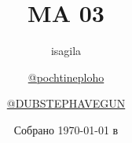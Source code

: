 \title{\huge \textbf{MA \LeC{} 03}}
\author{
	isagila
  \and
  \href{https://t.me/pochtineploho}{@pochtineploho}
  \and
  \href{https://t.me/DUBSTEPHAVEGUN}{@DUBSTEPHAVEGUN}
}
\date{Собрано {\ddmmyyyydate\today} в \currenttime}
\newcommand{\githublink}{https://github.com/isagila/tesc}

